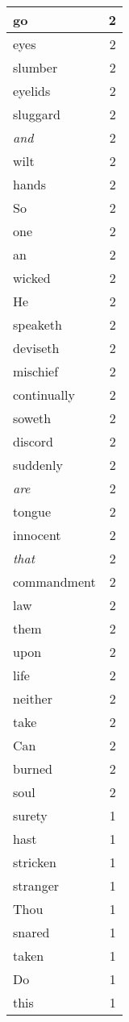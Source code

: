 \begin{center}
\begin{longtable}{l|r}
go & 2\\ \hline 
eyes & 2\\ \hline 
slumber & 2\\ \hline 
eyelids & 2\\ \hline 
sluggard & 2\\ \hline 
\emph{and} & 2\\ \hline 
wilt & 2\\ \hline 
hands & 2\\ \hline 
So & 2\\ \hline 
one & 2\\ \hline 
an & 2\\ \hline 
wicked & 2\\ \hline 
He & 2\\ \hline 
speaketh & 2\\ \hline 
deviseth & 2\\ \hline 
mischief & 2\\ \hline 
continually & 2\\ \hline 
soweth & 2\\ \hline 
discord & 2\\ \hline 
suddenly & 2\\ \hline 
\emph{are} & 2\\ \hline 
tongue & 2\\ \hline 
innocent & 2\\ \hline 
\emph{that} & 2\\ \hline 
commandment & 2\\ \hline 
law & 2\\ \hline 
them & 2\\ \hline 
upon & 2\\ \hline 
life & 2\\ \hline 
neither & 2\\ \hline 
take & 2\\ \hline 
Can & 2\\ \hline 
burned & 2\\ \hline 
soul & 2\\ \hline 
surety & 1\\ \hline 
hast & 1\\ \hline 
stricken & 1\\ \hline 
stranger & 1\\ \hline 
Thou & 1\\ \hline 
snared & 1\\ \hline 
taken & 1\\ \hline 
Do & 1\\ \hline 
this & 1\\ \hline 

\end{longtable}
\end{center}
